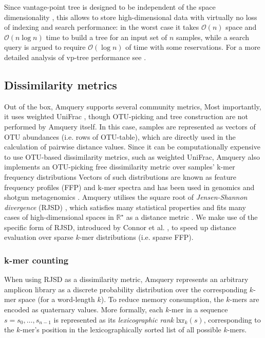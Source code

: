 \documentclass[10pt,letterpaper]{article}
\begin{document}
Since vantage-point tree is designed to be independent of the space dimensionality \cite{yianilos1993data}, this allows to store high-dimensional data with virtually no loss of indexing and search performance: in the worst case it takes $\mathcal{O}(n)$ space and $\mathcal{O}(n \log n)$ time to build a tree for an input set of $n$ samples, while a search query is argued to require $\mathcal{O}(\log n)$ of time with some reservations. 
For a more detailed analysis of vp-tree performance see \cite{yianilos1993data}.


\subsection*{Dissimilarity metrics}
Out of the box, Amquery supports several community metrics, Most importantly, it uses weighted UniFrac \cite{lozupone2011unifrac}, though OTU-picking and tree construction are not performed by Amquery itself. 
In this case, samples are represented as vectors of OTU abundances (i.e. rows of OTU-table), which are directly used in the calculation of pairwise distance values.
Since it can be computationally expensive to use OTU-based dissimilarity metrics, such as weighted UniFrac, Amquery also implements an OTU-picking free dissimilarity metric over samples' k-mer frequency distributions
Vectors of such distributions are known as feature frequency profiles (FFP) and k-mer spectra and has been used in genomics \cite{sims2009alignment} and shotgun metagenomics \cite{Dubinkina2016}. 
Amquery utilises the square root of \textit{Jensen-Shannon divergence} (RJSD) \cite{lin1991divergence}, which satisfies many statistical properties and fits many cases of high-dimensional spaces in $\mathbb{R^\star}$ as a distance metric \cite{fuglede2004jensen, endres2003new}. We make use of the specific form of RJSD, introduced by Connor et al. \cite{connor2013evaluation}, to speed up distance evaluation over sparse $k$-mer distributions (i.e. sparse FFP).

\subsubsection*{k-mer counting}
When using RJSD as a dissimilarity metric, Amquery represents an arbitrary amplicon library as a discrete probability distribution over the corresponding $k$-mer space (for a word-length $k$). 
To reduce memory consumption, the $k$-mers are encoded as quaternary values. 
More formally, each $k$-mer in a sequence $s = s_0,\dots,s_{n-1}$ is represented as its \textit{lexicographic rank} $\mathrm{lxr}_k(s)$, corresponding to the $k$-mer's position in the lexicographically sorted list of all possible $k$-mers.
\end{document}
